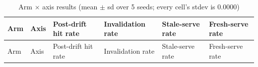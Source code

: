 \documentclass[
  11pt,
]{article}
\begin{document}
\begin{longtable}[]{@{}
  >{\raggedright\arraybackslash}p{}
  >{\raggedright\arraybackslash}p{}
  >{\raggedright\arraybackslash}p{}
  >{\raggedright\arraybackslash}p{}
  >{\raggedright\arraybackslash}p{}
  >{\raggedright\arraybackslash}p{}@{}}
\caption{Arm \(\times\) axis results (mean \(\pm\) sd over 5 seeds;
every cell's stdev is 0.0000)}\tabularnewline
\toprule\noalign{}
\begin{minipage}[b]{\linewidth}\raggedright
Arm
\end{minipage} & \begin{minipage}[b]{\linewidth}\raggedright
Axis
\end{minipage} & \begin{minipage}[b]{\linewidth}\raggedright
Post-drift hit rate
\end{minipage} & \begin{minipage}[b]{\linewidth}\raggedright
Invalidation rate
\end{minipage} & \begin{minipage}[b]{\linewidth}\raggedright
Stale-serve rate
\end{minipage} & \begin{minipage}[b]{\linewidth}\raggedright
Fresh-serve rate
\end{minipage} \\
\midrule\noalign{}
\endfirsthead
\toprule\noalign{}
\begin{minipage}[b]{\linewidth}\raggedright
Arm
\end{minipage} & \begin{minipage}[b]{\linewidth}\raggedright
Axis
\end{minipage} & \begin{minipage}[b]{\linewidth}\raggedright
Post-drift hit rate
\end{minipage} & \begin{minipage}[b]{\linewidth}\raggedright
Invalidation rate
\end{minipage} & \begin{minipage}[b]{\linewidth}\raggedright
Stale-serve rate
\end{minipage} & \begin{minipage}[b]{\linewidth}\raggedright
Fresh-serve rate
\end{minipage} \\

\end{longtable}
\end{document}
